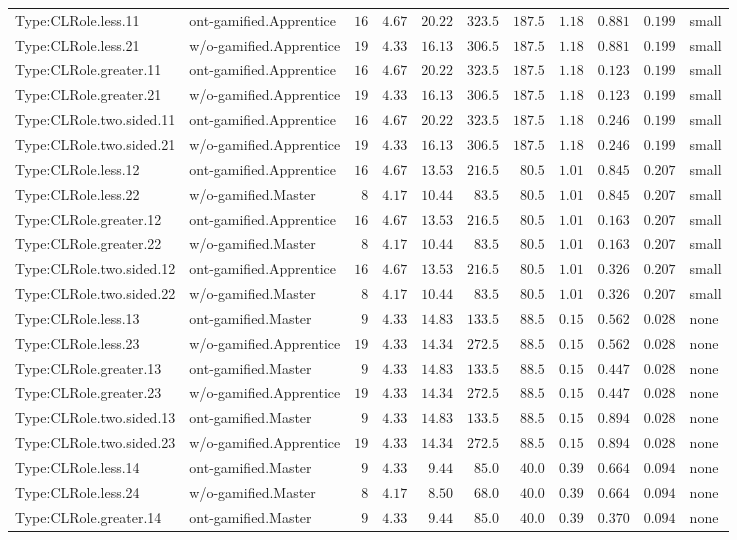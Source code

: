 \documentclass[6pt,a4paper]{article}
\begin{document}
{\begin{longtable}{llrrrrrrrrl}
Type:CLRole.less.11&ont-gamified.Apprentice&$16$&$4.67$&$20.22$&$323.5$&$187.5$&$1.18$&$0.881$&$0.199$&small\tabularnewline
Type:CLRole.less.21&w/o-gamified.Apprentice&$19$&$4.33$&$16.13$&$306.5$&$187.5$&$1.18$&$0.881$&$0.199$&small\tabularnewline
Type:CLRole.greater.11&ont-gamified.Apprentice&$16$&$4.67$&$20.22$&$323.5$&$187.5$&$1.18$&$0.123$&$0.199$&small\tabularnewline
Type:CLRole.greater.21&w/o-gamified.Apprentice&$19$&$4.33$&$16.13$&$306.5$&$187.5$&$1.18$&$0.123$&$0.199$&small\tabularnewline
Type:CLRole.two.sided.11&ont-gamified.Apprentice&$16$&$4.67$&$20.22$&$323.5$&$187.5$&$1.18$&$0.246$&$0.199$&small\tabularnewline
Type:CLRole.two.sided.21&w/o-gamified.Apprentice&$19$&$4.33$&$16.13$&$306.5$&$187.5$&$1.18$&$0.246$&$0.199$&small\tabularnewline
Type:CLRole.less.12&ont-gamified.Apprentice&$16$&$4.67$&$13.53$&$216.5$&$ 80.5$&$1.01$&$0.845$&$0.207$&small\tabularnewline
Type:CLRole.less.22&w/o-gamified.Master&$ 8$&$4.17$&$10.44$&$ 83.5$&$ 80.5$&$1.01$&$0.845$&$0.207$&small\tabularnewline
Type:CLRole.greater.12&ont-gamified.Apprentice&$16$&$4.67$&$13.53$&$216.5$&$ 80.5$&$1.01$&$0.163$&$0.207$&small\tabularnewline
Type:CLRole.greater.22&w/o-gamified.Master&$ 8$&$4.17$&$10.44$&$ 83.5$&$ 80.5$&$1.01$&$0.163$&$0.207$&small\tabularnewline
Type:CLRole.two.sided.12&ont-gamified.Apprentice&$16$&$4.67$&$13.53$&$216.5$&$ 80.5$&$1.01$&$0.326$&$0.207$&small\tabularnewline
Type:CLRole.two.sided.22&w/o-gamified.Master&$ 8$&$4.17$&$10.44$&$ 83.5$&$ 80.5$&$1.01$&$0.326$&$0.207$&small\tabularnewline
Type:CLRole.less.13&ont-gamified.Master&$ 9$&$4.33$&$14.83$&$133.5$&$ 88.5$&$0.15$&$0.562$&$0.028$&none\tabularnewline
Type:CLRole.less.23&w/o-gamified.Apprentice&$19$&$4.33$&$14.34$&$272.5$&$ 88.5$&$0.15$&$0.562$&$0.028$&none\tabularnewline
Type:CLRole.greater.13&ont-gamified.Master&$ 9$&$4.33$&$14.83$&$133.5$&$ 88.5$&$0.15$&$0.447$&$0.028$&none\tabularnewline
Type:CLRole.greater.23&w/o-gamified.Apprentice&$19$&$4.33$&$14.34$&$272.5$&$ 88.5$&$0.15$&$0.447$&$0.028$&none\tabularnewline
Type:CLRole.two.sided.13&ont-gamified.Master&$ 9$&$4.33$&$14.83$&$133.5$&$ 88.5$&$0.15$&$0.894$&$0.028$&none\tabularnewline
Type:CLRole.two.sided.23&w/o-gamified.Apprentice&$19$&$4.33$&$14.34$&$272.5$&$ 88.5$&$0.15$&$0.894$&$0.028$&none\tabularnewline
Type:CLRole.less.14&ont-gamified.Master&$ 9$&$4.33$&$ 9.44$&$ 85.0$&$ 40.0$&$0.39$&$0.664$&$0.094$&none\tabularnewline
Type:CLRole.less.24&w/o-gamified.Master&$ 8$&$4.17$&$ 8.50$&$ 68.0$&$ 40.0$&$0.39$&$0.664$&$0.094$&none\tabularnewline
Type:CLRole.greater.14&ont-gamified.Master&$ 9$&$4.33$&$ 9.44$&$ 85.0$&$ 40.0$&$0.39$&$0.370$&$0.094$&none\tabularnewline

\end{longtable}}
\end{document}
